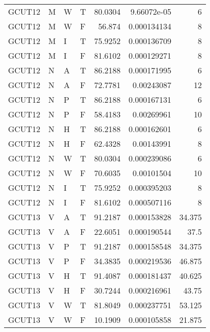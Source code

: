 \begin{longtable}{llllrrr}
    GCUT12   & M     & W     & T          & 80.0304    & 9.66072e-05 & 6        \\
    GCUT12   & M     & W     & F          & 56.874     & 0.000134134 & 8        \\
    GCUT12   & M     & I     & T          & 75.9252    & 0.000136709 & 8        \\
    GCUT12   & M     & I     & F          & 81.6102    & 0.000129271 & 8        \\
    GCUT12   & N     & A     & T          & 86.2188    & 0.000171995 & 6        \\
    GCUT12   & N     & A     & F          & 72.7781    & 0.00243087  & 12       \\
    GCUT12   & N     & P     & T          & 86.2188    & 0.000167131 & 6        \\
    GCUT12   & N     & P     & F          & 58.4183    & 0.00269961  & 10       \\
    GCUT12   & N     & H     & T          & 86.2188    & 0.000162601 & 6        \\
    GCUT12   & N     & H     & F          & 62.4328    & 0.00143991  & 8        \\
    GCUT12   & N     & W     & T          & 80.0304    & 0.000239086 & 6        \\
    GCUT12   & N     & W     & F          & 70.6035    & 0.00101504  & 10       \\
    GCUT12   & N     & I     & T          & 75.9252    & 0.000395203 & 8        \\
    GCUT12   & N     & I     & F          & 81.6102    & 0.000507116 & 8        \\
    GCUT13   & V     & A     & T          & 91.2187    & 0.000153828 & 34.375   \\
    GCUT13   & V     & A     & F          & 22.6051    & 0.000190544 & 37.5     \\
    GCUT13   & V     & P     & T          & 91.2187    & 0.000158548 & 34.375   \\
    GCUT13   & V     & P     & F          & 34.3835    & 0.000219536 & 46.875   \\
    GCUT13   & V     & H     & T          & 91.4087    & 0.000181437 & 40.625   \\
    GCUT13   & V     & H     & F          & 30.7244    & 0.000216961 & 43.75    \\
    GCUT13   & V     & W     & T          & 81.8049    & 0.000237751 & 53.125   \\
    GCUT13   & V     & W     & F          & 10.1909    & 0.000105858 & 21.875   \\

\end{longtable}
